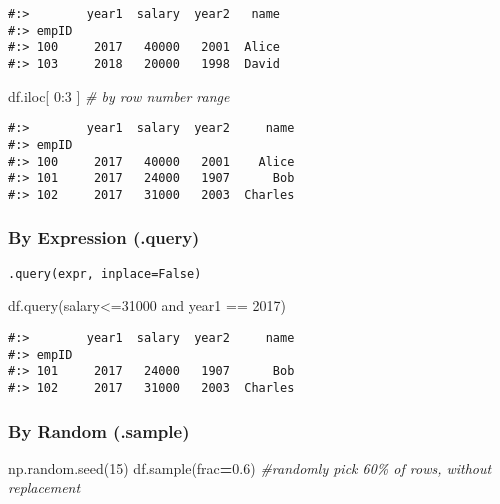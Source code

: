 \documentclass[
]{book}
\newenvironment{Shaded}{\begin{snugshade}}{\end{snugshade}}
\newcommand{\CommentTok}[1]{\textcolor[rgb]{0.37,0.37,0.37}{\textit{#1}}}
\newcommand{\DecValTok}[1]{\textcolor[rgb]{0.06,0.06,0.06}{#1}}
\newcommand{\FloatTok}[1]{\textcolor[rgb]{0.06,0.06,0.06}{#1}}
\newcommand{\NormalTok}[1]{#1}
\newcommand{\OperatorTok}[1]{\textcolor[rgb]{0.43,0.43,0.43}{\textbf{#1}}}
\newcommand{\StringTok}[1]{\textcolor[rgb]{0.5,0.5,0.5}{#1}}
\begin{document}
\begin{verbatim}
#:>        year1  salary  year2   name
#:> empID                             
#:> 100     2017   40000   2001  Alice
#:> 103     2018   20000   1998  David
\end{verbatim}

\begin{Shaded}
\begin{Highlighting}[]
\NormalTok{df.iloc[  }\DecValTok{0}\NormalTok{:}\DecValTok{3}\NormalTok{  ]    }\CommentTok{\# by row number range}
\end{Highlighting}
\end{Shaded}

\begin{verbatim}
#:>        year1  salary  year2     name
#:> empID                               
#:> 100     2017   40000   2001    Alice
#:> 101     2017   24000   1907      Bob
#:> 102     2017   31000   2003  Charles
\end{verbatim}

\hypertarget{by-expression-.query}{%
\subsubsection{By Expression (.query)}\label{by-expression-.query}}

\texttt{.query(expr,\ inplace=False)}

\begin{Shaded}
\begin{Highlighting}[]
\NormalTok{df.query(}\StringTok{\textquotesingle{}salary\textless{}=31000 and year1 == 2017\textquotesingle{}}\NormalTok{)}
\end{Highlighting}
\end{Shaded}

\begin{verbatim}
#:>        year1  salary  year2     name
#:> empID                               
#:> 101     2017   24000   1907      Bob
#:> 102     2017   31000   2003  Charles
\end{verbatim}

\hypertarget{by-random-.sample}{%
\subsubsection{By Random (.sample)}\label{by-random-.sample}}

\begin{Shaded}
\begin{Highlighting}[]
\NormalTok{np.random.seed(}\DecValTok{15}\NormalTok{)}
\NormalTok{df.sample(frac}\OperatorTok{=}\FloatTok{0.6}\NormalTok{) }\CommentTok{\#randomly pick 60\% of rows, without replacement}
\end{Highlighting}
\end{Shaded}
\end{document}
